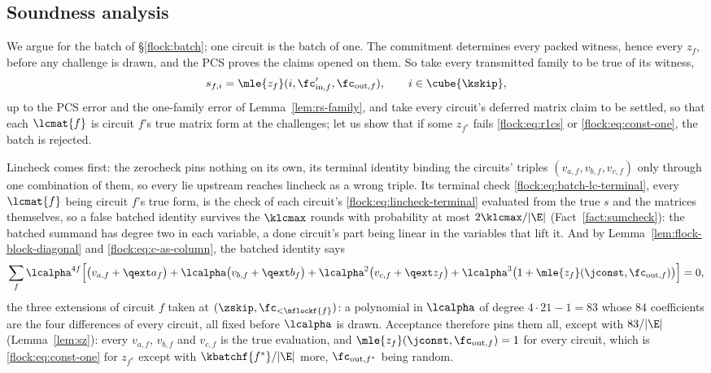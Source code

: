 \subsection{Soundness analysis}\label{flock:soundness}

We argue for the batch of \S\ref{flock:batch}; one circuit is the batch of one. The commitment determines every packed witness, hence every $z_f$, before any challenge is drawn, and the PCS proves the claims opened on them. So take every transmitted family to be true of its witness,
\[
s_{f,i}=\mle{z_f}(i,\fc'_{\mathrm{in},f},\fc_{\mathrm{out},f}),\qquad i\in\cube{\kskip},
\]
up to the PCS error and the one-family error of Lemma~\ref{lem:rs-family}, and take every circuit's deferred matrix claim to be settled, so that each $\lcmat{f}$ is circuit $f$'s true matrix form at the challenges; let us show that if some $z_{f^\ast}$ fails \eqref{flock:eq:r1cs} or \eqref{flock:eq:const-one}, the batch is rejected.

Lincheck comes first: the zerocheck pins nothing on its own, its terminal identity binding the circuits' triples $(v_{a,f},v_{b,f},v_{c,f})$ only through one combination of them, so every lie upstream reaches lincheck as a wrong triple. Its terminal check \eqref{flock:eq:batch-lc-terminal}, every $\lcmat{f}$ being circuit $f$'s true form, is the check of each circuit's \eqref{flock:eq:lincheck-terminal} evaluated from the true $s$ and the matrices themselves, so a false batched identity survives the $\klcmax$ rounds with probability at most $2\klcmax/|\E|$ (Fact~\ref{fact:sumcheck}): the batched summand has degree two in each variable, a done circuit's part being linear in the variables that lift it. And by Lemma~\ref{lem:flock-block-diagonal} and \eqref{flock:eq:c-as-column}, the batched identity says
\[
\sum_f\lcalpha^{4f}\Bigl[\bigl(v_{a,f}+\qext a_f\bigr)+\lcalpha\bigl(v_{b,f}+\qext b_f\bigr)+\lcalpha^2\bigl(v_{c,f}+\qext z_f\bigr)+\lcalpha^3\bigl(1+\mle{z_f}(\jconst,\fc_{\mathrm{out},f})\bigr)\Bigr]=0,
\]
the three extensions of circuit $f$ taken at $(\zskip,\fc_{<\nflockf{f}})$: a polynomial in $\lcalpha$ of degree $4\cdot21-1=83$ whose $84$ coefficients are the four differences of every circuit, all fixed before $\lcalpha$ is drawn. Acceptance therefore pins them all, except with $83/|\E|$ (Lemma~\ref{lem:sz}): every $v_{a,f}$, $v_{b,f}$ and $v_{c,f}$ is the true evaluation, and $\mle{z_f}(\jconst,\fc_{\mathrm{out},f})=1$ for every circuit, which is \eqref{flock:eq:const-one} for $z_{f^\ast}$ except with $\kbatchf{f^\ast}/|\E|$ more, $\fc_{\mathrm{out},f^\ast}$ being random.

